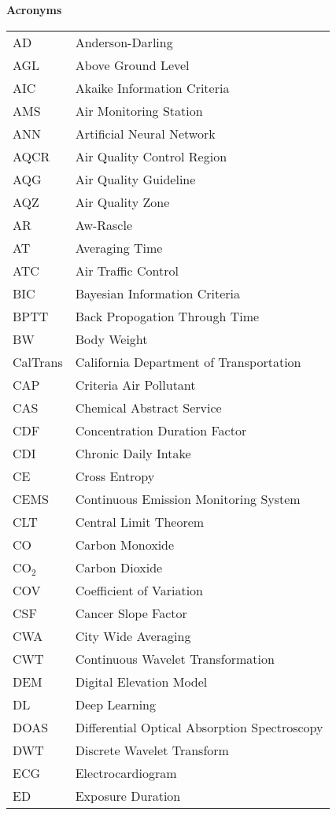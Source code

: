 \LARGE
\textbf{Acronyms}

\ssp
\small

\begin{longtable}{ll}
AD & Anderson-Darling \\
AGL & Above Ground Level \\
AIC & Akaike Information Criteria \\
AMS & Air Monitoring Station \\
ANN & Artificial Neural Network \\
AQCR & Air Quality Control Region \\
AQG & Air Quality Guideline \\
AQZ & Air Quality Zone \\
AR & Aw-Rascle \\
AT & Averaging Time \\
ATC & Air Traffic Control \\
BIC & Bayesian Information Criteria \\
BPTT & Back Propogation Through Time \\
BW & Body Weight \\
CalTrans & California Department of Transportation \\
CAP & Criteria Air Pollutant \\
CAS & Chemical Abstract Service \\
CDF & Concentration Duration Factor \\
CDI & Chronic Daily Intake \\
CE & Cross Entropy \\
CEMS & Continuous Emission Monitoring System \\
CLT & Central Limit Theorem \\
CO & Carbon Monoxide \\
CO$_{2}$ & Carbon Dioxide \\
COV & Coefficient of Variation \\
CSF & Cancer Slope Factor \\
CWA & City Wide Averaging \\
CWT & Continuous Wavelet Transformation \\
DEM & Digital Elevation Model \\
DL & Deep Learning \\
DOAS & Differential Optical Absorption Spectroscopy \\
DWT & Discrete Wavelet Transform \\
ECG & Electrocardiogram \\
ED & Exposure Duration \\

\end{longtable}
